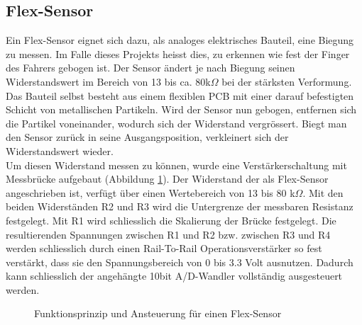 \subsection{Flex-Sensor}
\label{tGl_FlexSensor}
Ein Flex-Sensor eignet sich dazu, als analoges elektrisches Bauteil, eine Biegung zu messen. Im Falle dieses Projekts heisst dies, zu erkennen wie fest der Finger des Fahrers gebogen ist. 
Der Sensor ändert je nach Biegung seinen Widerstandswert im Bereich von 13 bis ca. 80k$\Omega$ bei der stärksten Verformung. Das Bauteil selbst besteht aus einem flexiblen PCB mit einer darauf befestigten Schicht von metallischen Partikeln. Wird der Sensor nun gebogen, entfernen sich die Partikel voneinander, wodurch sich der Widerstand vergrössert. Biegt man den Sensor zurück in seine Ausgangsposition, verkleinert sich der Widerstandswert wieder.
\\
Um diesen Widerstand messen zu können, wurde eine Verstärkerschaltung mit Messbrücke aufgebaut (Abbildung \ref{fig:gl_Flex-Sensor}). Der Widerstand der als Flex-Sensor angeschrieben ist, verfügt über einen Wertebereich von 13 bis 80 k$\Omega$. Mit den beiden Widerständen R2 und R3 wird die Untergrenze der messbaren Resistanz festgelegt. Mit R1 wird schliesslich die Skalierung der Brücke festgelegt. Die resultierenden Spannungen zwischen R1 und R2 bzw. zwischen R3 und R4 werden schliesslich durch einen Rail-To-Rail Operationsverstärker so fest verstärkt, dass sie den Spannungsbereich von 0 bis 3.3 Volt ausnutzen. Dadurch kann schliesslich der
angehängte 10bit A/D-Wandler vollständig ausgesteuert werden.
\begin{figure} [H]
	\centering
{}
\caption[FlexSensor]{Funktionsprinzip und Ansteuerung für einen Flex-Sensor}
\label{fig:gl_Flex-Sensor}
\end{figure}

